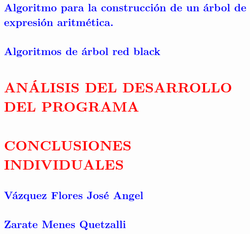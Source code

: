 \documentclass[12pt]{article}
\begin{document}
\subsection*{\textcolor{blue}{Algoritmo para la construcción de un árbol de expresión aritmética. }}

\subsection*{\textcolor{blue}{Algoritmos de árbol red black }}





\section*{\textcolor{red}{\textbf{ANÁLISIS DEL DESARROLLO DEL PROGRAMA}}}

\subsection*{\textcolor{blue}{  }}

\subsection*{\textcolor{blue}{  }}

\subsection*{\textcolor{blue}{  }}





\section*{\textcolor{red}{\textbf{CONCLUSIONES INDIVIDUALES}}}

\subsection*{\textcolor{blue}{  }}

\subsection*{\textcolor{blue}{Vázquez Flores José Angel}}



\subsection*{\textcolor{blue}{Zarate Menes Quetzalli}}
\end{document}
